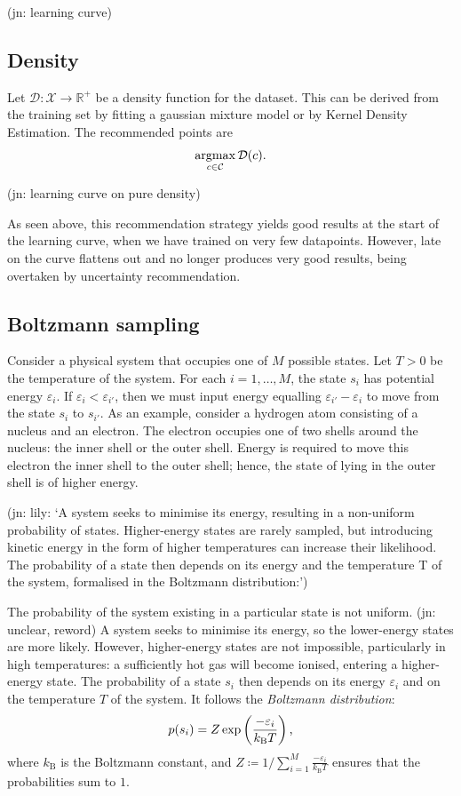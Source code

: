 \documentclass[11pt,twoside]{report}
\newcommand\bbR{\mathbb{R}}
\newcommand\cC{\mathcal{C}}
\newcommand\cD{\mathcal{D}}
\newcommand\cX{\mathcal{X}}
\DeclareMathOperator*{\argmax}{argmax}
\newcommand\jn[1]{{\color{red}(jn: #1)}}
\begin{document}
\jn{learning curve}

\subsection{Density}

Let $\cD : \cX \to \bbR^+$ be a density function for the dataset. This can be derived from the training set by fitting a gaussian mixture model or by Kernel Density Estimation. The recommended points are \[
    \argmax_{c \in \cC} \cD(c) \text.
\]

\jn{learning curve on pure density}

As seen above, this recommendation strategy yields good results at the start of the learning curve, when we have trained on very few datapoints. However, late on the curve flattens out and no longer produces very good results, being overtaken by uncertainty recommendation.

\subsection{Boltzmann sampling}

Consider a physical system that occupies one of $M$ possible states. Let $T > 0$ be the temperature of the system. For each $i=1, \dots, M$, the state $s_i$ has potential energy $\varepsilon_i$. If $\varepsilon_i < \varepsilon_{i'}$, then we must input energy equalling $\varepsilon_{i'} - \varepsilon_i$ to move from the state $s_i$ to $s_{i'}$. As an example, consider a hydrogen atom consisting of a nucleus and an electron. The electron occupies one of two shells around the nucleus: the inner shell or the outer shell. Energy is required to move this electron the inner shell to the outer shell; hence, the state of lying in the outer shell is of higher energy.

\jn{lily: `A system seeks to minimise its energy, resulting in a non-uniform probability of states. Higher-energy states are rarely sampled, but introducing kinetic energy in the form of higher temperatures can increase their likelihood. The probability of a state then depends on its energy and the temperature T of the system, formalised in the Boltzmann distribution:'}

The probability of the system existing in a particular state is not uniform. \jn{unclear, reword} A system seeks to minimise its energy, so the lower-energy states are more likely. However, higher-energy states are not impossible, particularly in high temperatures: a sufficiently hot gas will become ionised, entering a higher-energy state. The probability of a state $s_i$ then depends on its energy $\varepsilon_i$ and on the temperature $T$ of the system. It follows the \textit{Boltzmann distribution}:\[
  p(s_i) = Z\exp\left(\frac{-\varepsilon_i}{k_\mathrm{B}T}\right) \text,
\] where $k_\mathrm{B}$ is the Boltzmann constant, and $Z \coloneqq 1/\sum^{M}_{i=1}\frac{-\varepsilon_i}{k_\mathrm{B}T}$ ensures that the probabilities sum to $1$.
\end{document}
